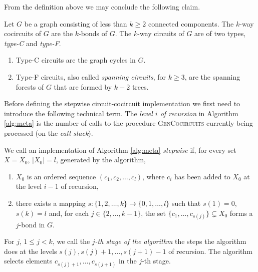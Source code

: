 From the definition above we may conclude the following claim.

\begin{claim}
	\label{claim:circuit_types}
	Let $G$ be a graph consisting of less than $k \geq 2$ connected components.
	The $k$-way cocircuits of $G$ are the $k$-bonds of $G$. The $k$-way circuits of $G$ are of two types, \textit{type-C} and \textit{type-F}.

	\begin{enumerate}
		\item Type-C circuits are the graph cycles in $G$.
		\item Type-F circuits, also called \textit{spanning circuits}, for $k \geq 3$, are the spanning forests of $G$ that are formed by $k-2$ trees.
	\end{enumerate}
\end{claim}

Before defining the stepwise circuit-cocircuit implementation we first need to introduce the following technical term. The \textit{level $i$ of recursion} in Algorithm \ref{alg:meta} is the number of calls to the procedure \textsc{GenCocircuits} currently being processed (on the \textit{call stack}).

\begin{defn}
	\label{defn:stepwise_scheme}

	We call an implementation of Algorithm \ref{alg:meta} \textit{stepwise} if, for every set $X = X_0$, $\lvert X_0 \rvert = l$, generated by the algorithm,

	\begin{enumerate}
		\item $X_0$ is an ordered sequence $(c_1, c_2,\ldots,c_l)$, where $c_i$ has been \linebreak added to $X_0$ at the level $i-1$ of recursion,
		\item there exists a mapping $s : \{1,2,\ldots,k\} \rightarrow \{0,1,\ldots,l\}$ such that $s(1) = 0$, $s(k) = l$ and, for each $j \in \{2,\ldots,k-1\}$, the set $\{c_1,\ldots,c_{s(j)}\} \subsetneq X_0$ forms a $j$-bond in $G$.
	\end{enumerate}

	\noindent For $j$, $1 \leq j < k$, we call the \textit{$j$-th stage of the algorithm} the steps the algorithm does at the levels $s(j), s(j) + 1,\ldots, s(j+1)-1$ of recursion. The algorithm selects elements $c_{s(j)+1},\ldots,c_{s(j+1)}$ in the $j$-th stage.

\end{defn}

